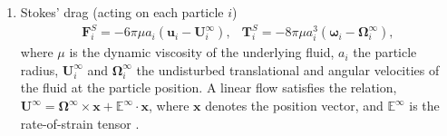 \begin{enumerate}

\item Stokes' drag (acting on each particle $i$)
  \begin{subequations}
    \begin{equation} 
      \begin{aligned}
        {\bm F}^S_i = -6\pi\mu a_i({\bm u}_i - {\bm U}^\infty_i), 
      \end{aligned}
    \end{equation}
    \begin{equation} 
      \begin{aligned}
        {\bm T}^S_i = -8\pi\mu a_i^3({\bm \omega}_i - {\bm \Omega}^\infty_i),
      \end{aligned}
    \end{equation}
  \end{subequations}
  where $\mu$ is the dynamic viscosity of the underlying fluid, $a_i$ the particle radius, ${\bm U}^\infty_i$ and ${\bm \Omega}^\infty_i$ the undisturbed translational and angular velocities of the fluid at the particle position. A linear flow satisfies the relation,
  ${\bm U}^\infty={\bm \Omega}^\infty \times {\bm x} + \mathbb{E}^\infty \cdot {\bm x}$, where $\bm x$ denotes the position vector, and $\mathbb{E}^\infty$ is the rate-of-strain tensor \citep{Batchelor}.
  

\end{enumerate}
